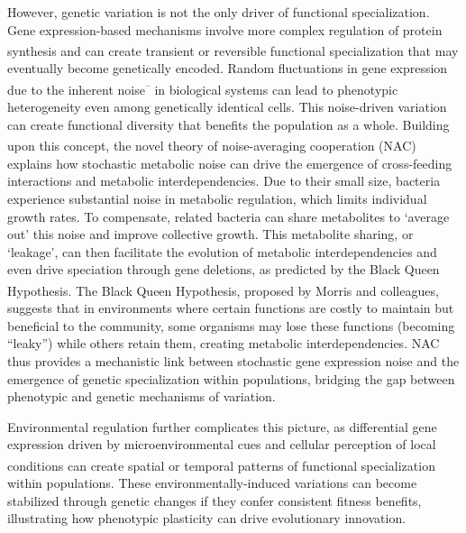 \documentclass[
  11pt,
  a4paper,
]{report}
\begin{document}
However, genetic variation is not the only driver of functional
specialization. Gene expression-based mechanisms involve more complex
regulation of protein synthesis and can create transient or
reversible\textsuperscript{} functional
specialization that may eventually become genetically encoded. Random
fluctuations in gene expression due to the inherent
noise\textsuperscript{--}
in biological systems can lead to phenotypic heterogeneity even among
genetically identical cells. This noise-driven variation can create
functional diversity that benefits the population as a whole. Building
upon this concept, the novel theory of noise-averaging cooperation
(NAC)\textsuperscript{} explains how
stochastic metabolic noise can drive the emergence of cross-feeding
interactions and metabolic interdependencies. Due to their small size,
bacteria experience substantial noise in metabolic regulation, which
limits individual growth rates. To compensate, related bacteria can
share metabolites to `average out' this noise and improve collective
growth. This metabolite sharing, or `leakage', can then facilitate the
evolution of metabolic interdependencies and even drive speciation
through gene deletions, as predicted by the Black Queen
Hypothesis\textsuperscript{}. The Black
Queen Hypothesis, proposed by Morris and colleagues, suggests that in
environments where certain functions are costly to maintain but
beneficial to the community, some organisms may lose these functions
(becoming ``leaky'') while others retain them, creating metabolic
interdependencies. NAC thus provides a mechanistic link between
stochastic gene expression noise and the emergence of genetic
specialization within populations, bridging the gap between phenotypic
and genetic mechanisms of variation.

Environmental regulation further complicates this picture, as
differential gene expression driven by microenvironmental cues and
cellular perception of local
conditions\textsuperscript{} can create
spatial or temporal patterns of functional specialization within
populations. These environmentally-induced variations can become
stabilized through genetic changes if they confer consistent fitness
benefits, illustrating how phenotypic plasticity can drive evolutionary
innovation.
\end{document}
